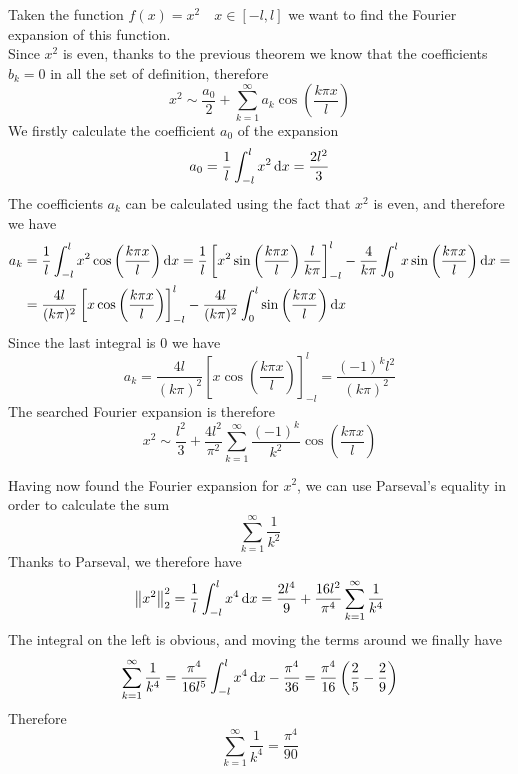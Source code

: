 \documentclass[../complete.tex]{subfiles}
\begin{document}
\begin{eg}
	Taken the function $f(x)=x^2\quad x\in[-l,l]$ we want to find the Fourier expansion of this function.\\
	Since $x^2$ is even, thanks to the previous theorem we know that the coefficients $b_k=0$ in all the set of definition, therefore
	\begin{equation*}
		x^2\sim\frac{a_0}{2}+\sum_{k=1}^{\infty}a_k\cos\left( \frac{k\pi x}{l} \right)
	\end{equation*}
	We firstly calculate the coefficient $a_0$ of the expansion
	\begin{equation*}
		a_0=\frac{1}{l}\int_{-l}^{l}x^2\diff x=\frac{2l^2}{3}
	\end{equation*}
	The coefficients $a_k$ can be calculated using the fact that $x^2$ is even, and therefore we have
	\begin{equation*}
		\begin{aligned}
			a_k&=\frac{1}{l}\int_{-l}^{l}x^2\cos\left( \frac{k\pi x}{l} \right)\diff x=\frac{1}{l}\left[ x^2\sin\left( \frac{k\pi x}{l} \right)\frac{l}{k\pi} \right]^l_{-l}-\frac{4}{k\pi}\int_{0}^{l}x\sin\left( \frac{k\pi x}{l} \right)\diff x=\\
			&=\frac{4l}{(k\pi)^2}\left[ x\cos\left( \frac{k\pi x}{l} \right) \right]^l_{-l}-\frac{4l}{(k\pi)^2}\int_{0}^{l}\sin\left( \frac{k\pi x}{l} \right)\diff x
		\end{aligned}
	\end{equation*}
	Since the last integral is $0$ we have
	\begin{equation*}
		a_k=\frac{4l}{(k\pi)^2}\left[ x\cos\left( \frac{k\pi x}{l} \right) \right]^l_{-l}=\frac{(-1)^kl^2}{(k\pi)^2}
	\end{equation*}
	The searched Fourier expansion is therefore
	\begin{equation*}
		x^2\sim\frac{l^2}{3}+\frac{4l^2}{\pi^2}\sum_{k=1}^{\infty}\frac{(-1)^k}{k^2}\cos\left( \frac{k\pi x}{l} \right)
	\end{equation*}
\end{eg}
\begin{eg}
	Having now found the Fourier expansion for $x^2$, we can use Parseval's equality in order to calculate the sum
	\begin{equation*}
		\sum_{k=1}^{\infty}\frac{1}{k^2}
	\end{equation*}
	Thanks to Parseval, we therefore have
	\begin{equation*}
		\pnorm[2]{x^2}^2=\frac{1}{l}\int_{-l}^{l}x^4\diff x=\frac{2l^4}{9}+\frac{16l^2}{\pi^4}\sum_{k=1}^{\infty}\frac{1}{k^4}
	\end{equation*}
	The integral on the left is obvious, and moving the terms around we finally have
	\begin{equation*}
		\sum_{k=1}^{\infty}\frac{1}{k^4}=\frac{\pi^4}{16l^5}\int_{-l}^{l}x^4\diff x-\frac{\pi^4}{36}=\frac{\pi^4}{16}\left( \frac{2}{5}-\frac{2}{9} \right)%
	\end{equation*}
	Therefore
	\begin{equation*}
		\sum_{k=1}^{\infty}\frac{1}{k^4}=\frac{\pi^4}{90}
	\end{equation*}
\end{eg}
\end{document}
